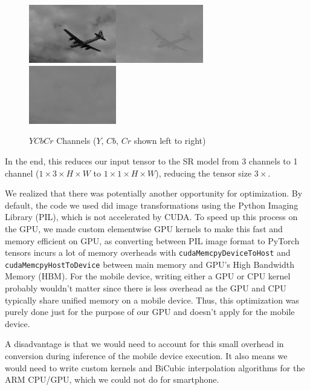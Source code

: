 \documentclass{article}
\begin{document}
\begin{figure}
	\centerline{\includegraphics[width=1.5in]{../final/figures/y_img.png}\includegraphics[width=1.5in]{../final/figures/cb_img.png}\includegraphics[width=1.5in]{../final/figures/cr_img.png}}
	\caption{$YCbCr$ Channels ($Y$, $Cb$, $Cr$ shown left to right)}
	\label{fig:ycbcr}
\end{figure}

In the end, this reduces our input tensor to the SR model from 3 channels to 1 channel ($1 \times 3 \times H \times W$ to $1 \times 1 \times H \times W$), reducing the tensor size $3\times$.


We realized that there was potentially another opportunity for optimization. By default, the code we used did image transformations using the Python Imaging Library (PIL), which is not accelerated by CUDA. To speed up this process on the GPU, we made custom elementwise GPU kernels to make this fast and memory efficient on GPU, as converting between PIL image format to PyTorch tensors incurs a lot of memory overheads with \verb|cudaMemcpyDeviceToHost| and \verb|cudaMemcpyHostToDevice| between main memory and GPU's High Bandwidth Memory (HBM). For the mobile device, writing either a GPU or CPU kernel probably wouldn't matter since there is less overhead as the GPU and CPU typically share unified memory on a mobile device. Thus, this optimization was purely done just for the purpose of our GPU and doesn't apply for the mobile device.

A disadvantage is that we would need to account for this small overhead in conversion during inference of the mobile device execution. It also means we would need to write custom kernels and BiCubic interpolation algorithms for the ARM CPU/GPU, which we could not do for smartphone.
\end{document}
